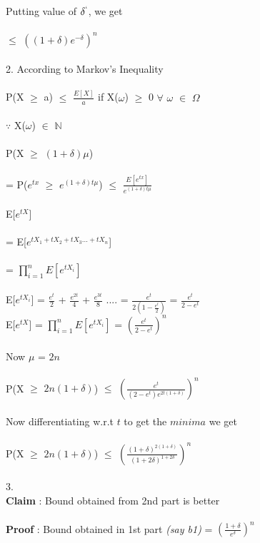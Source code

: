 \documentclass{article}
\begin{document}
Putting value of $\delta^{`}$, we get \\\\ 
$\leq$ $((1 + \delta)e^{-\delta})^{n}$ \\\\
2.
According to Markov's Inequality \\\\
P(X $\geq$ a) $\leq$ $\frac{E[X]}{a}$ if X($\omega$) $\geq$ 0 $\forall$ $\omega$ $\in$ $\Omega$ \\\\
$\because$ X($\omega$) $\in$ $\mathbb{N}$ \\\\ 
P(X $\geq$ $(1 + \delta)\mu$) \\\\
= P($e^{tx}$ $\geq$ $e^{(1 + \delta)t\mu}$) $\leq$ $\frac{E[e^{tx}]}{e^{(1 + \delta)t\mu}}$\\\\
E[$e^{tX}$] \\\\
= E[$e^{tX_1 + tX_2 + tX_3 ... + tX_n}$] \\\\
=  $\prod_{i=1}^{n} E[e^{tX_i}]$ \\\\
E[$e^{tX_i}$] = $\frac{e^{t}}{2}$ + $\frac{e^{2t}}{4}$ + $\frac{e^{3t}}{8}$ .... 
= $\frac{e^{t}}{2(1-\frac{e^{t}}{2})}$
= $\frac{e^{t}}{2 - e^{t}}$ \\
E[$e^{tX}$] = $\prod_{i=1}^{n} E[e^{tX_i}]$ = $(\frac{e^{t}}{2 - e^{t}})^{n}$ \\\\
Now $\mu$ = $2n$ \\\\
P(X $\geq$ $2n(1 + \delta)$) $\leq$ $(\frac{e^{t}}{(2 - e^{t})e^{2t(1+\delta)}})^{n}$\\\\
Now differentiating w.r.t $t$ to get the $minima$ we get \\\\
P(X $\geq$ $2n(1+\delta)$) $\leq$ $(\frac{(1+\delta)^{2(1+\delta)}}{(1+2\delta)^{1+2\delta}})^{n}$ \\\\
3. \\
\textbf{Claim} : Bound obtained from 2nd part is better \\\\ 
\textbf{Proof} : Bound obtained in 1st part \textit{(say b1)} = $(\frac{1+\delta}{e^{\delta}})^{n}$ \\\\ 
\end{document}
